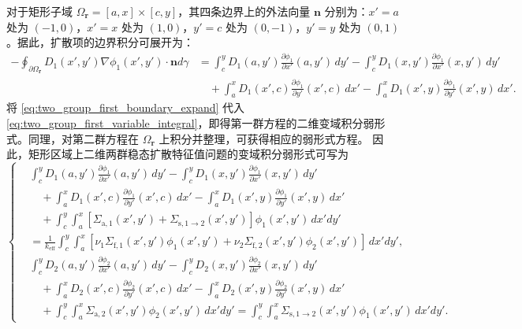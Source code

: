 \documentclass[final,3p,times,sort&compress]{elsarticle}
\begin{document}
对于矩形子域 $\Omega_{\boldsymbol r}=[a,x]\times[c,y]$，其四条边界上的外法向量 $\boldsymbol n$ 分别为：$x'=a$ 处为 $(-1,0)$，$x'=x$ 处为 $(1,0)$，$y'=c$ 处为 $(0,-1)$，$y'=y$ 处为 $(0,1)$。据此，扩散项的边界积分可展开为：
\begin{equation}
\begin{aligned}
     -\oint_{\partial\Omega_{\boldsymbol r}} D_1(x',y') \nabla \phi_1(x',y') \cdot \boldsymbol n d\gamma
    &= \int_{c}^{y} D_1(a,y') \frac{\partial \phi_1}{\partial x'}(a,y') \,dy' - \int_{c}^{y} D_1(x,y') \frac{\partial \phi_1}{\partial x'}(x,y') \,dy' \\
    &\quad + \int_{a}^{x} D_1(x',c) \frac{\partial \phi_1}{\partial y'}(x',c) \,dx' - \int_{a}^{x} D_1(x',y) \frac{\partial \phi_1}{\partial y'}(x',y) \,dx' .
\end{aligned}
\label{eq:two_group_first_boundary_expand}
\end{equation}
将 \cref{eq:two_group_first_boundary_expand} 代入 \cref{eq:two_group_first_variable_integral}，即得第一群方程的二维变域积分弱形式。同理，对第二群方程在 $\Omega_{\boldsymbol r}$ 上积分并整理，可获得相应的弱形式方程。
因此，矩形区域上二维两群稳态扩散特征值问题的变域积分弱形式可写为
\begin{equation}
\left\{
\begin{aligned}
    &
    \int_{c}^{y}
    D_1(a,y')
    \frac{\partial \phi_1}{\partial x'}(a,y')
    \,dy'
    -
    \int_{c}^{y}
    D_1(x,y')
    \frac{\partial \phi_1}{\partial x'}(x,y')
    \,dy'
    \\
    &\quad
    +
    \int_{a}^{x}
    D_1(x',c)
    \frac{\partial \phi_1}{\partial y'}(x',c)
    \,dx'
    -
    \int_{a}^{x}
    D_1(x',y)
    \frac{\partial \phi_1}{\partial y'}(x',y)
    \,dx'
    \\
    &\quad
    +
    \int_{c}^{y}
    \int_{a}^{x}
    \left[
    \Sigma_{\mathrm a,1}(x',y')
    +
    \Sigma_{\mathrm s,1\rightarrow2}(x',y')
    \right]
    \phi_1(x',y')
    \,dx'dy'
    \\
    &=
    \frac{1}{k_{\mathrm{eff}}}
    \int_{c}^{y}
    \int_{a}^{x}
    \left[
    \nu_1\Sigma_{\mathrm f,1}(x',y')\phi_1(x',y')
    +
    \nu_2\Sigma_{\mathrm f,2}(x',y')\phi_2(x',y')
    \right]
    \,dx'dy',
    \\[0.8em]
    &
    \int_{c}^{y}
    D_2(a,y')
    \frac{\partial \phi_2}{\partial x'}(a,y')
    \,dy'
    -
    \int_{c}^{y}
    D_2(x,y')
    \frac{\partial \phi_2}{\partial x'}(x,y')
    \,dy'
    \\
    &\quad
    +
    \int_{a}^{x}
    D_2(x',c)
    \frac{\partial \phi_2}{\partial y'}(x',c)
    \,dx'
    -
    \int_{a}^{x}
    D_2(x',y)
    \frac{\partial \phi_2}{\partial y'}(x',y)
    \,dx'
    \\
    &\quad
    +
    \int_{c}^{y}
    \int_{a}^{x}
    \Sigma_{\mathrm a,2}(x',y')
    \phi_2(x',y')
    \,dx'dy'
    =
    \int_{c}^{y}
    \int_{a}^{x}
    \Sigma_{\mathrm s,1\rightarrow2}(x',y')
    \phi_1(x',y')
    \,dx'dy' .
\end{aligned}
\right.
\label{eq:two_group_variable_weak_form}
\end{equation}
\end{document}
